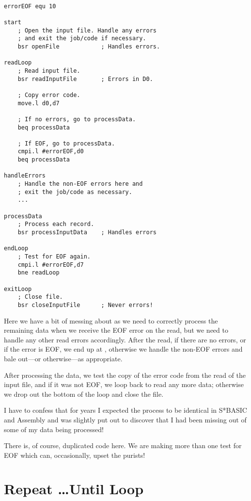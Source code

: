 \begin{lstlisting}[caption={Repeat loops with EOF exit in Assembly Code},label={lis: Repeat loop with EOF exit}]
    
errorEOF equ 10

start
    ; Open the input file. Handle any errors
    ; and exit the job/code if necessary.
    bsr openFile            ; Handles errors.

readLoop
    ; Read input file.
    bsr readInputFile       ; Errors in D0.
    
    ; Copy error code.
    move.l d0,d7

    ; If no errors, go to processData.
    beq processData
    
    ; If EOF, go to processData.
    cmpi.l #errorEOF,d0
    beq processData
    
handleErrors
    ; Handle the non-EOF errors here and
    ; exit the job/code as necessary.
    ...

processData
    ; Process each record.
    bsr processInputData    ; Handles errors

endLoop
    ; Test for EOF again.
    cmpi.l #errorEOF,d7
    bne readLoop

exitLoop
    ; Close file.    
    bsr closeInputFile      ; Never errors!
\end{lstlisting}

Here we have a bit of messing about as we need to correctly process the remaining data when we receive the EOF error on the read, but we need to handle any other read errors accordingly. After the read, if there are no errors, or if the error is EOF, we end up at , otherwise we handle the non-EOF errors and bale out---or otherwise---as appropriate.

After processing the data, we test the copy of the error code from the read of the input file, and if it was not EOF, we loop back to read any more data; otherwise we drop out the bottom of the loop and close the file.

I have to confess that for years I expected the process to be identical in S*BASIC and Assembly and was slightly put out to discover that I had been missing out of some of my data being processed!

There is, of course, duplicated code here. We are making more than one test for EOF which can, occasionally, upset the purists!



\section{Repeat \ldots\protect Until Loop}\label{section: repeat until loops}

